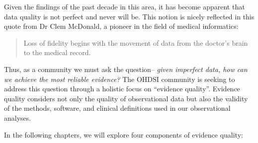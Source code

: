 \documentclass[11pt]{book}
\theoremstyle{definition}
\theoremstyle{definition}
\theoremstyle{definition}
\theoremstyle{remark}
\begin{document}
Given the findings of the past decade in this area, it has become apparent that data quality is not perfect and never will be. This notion is nicely reflected in this quote from Dr Clem McDonald, a pioneer in the field of medical informatics:

\begin{quote}
Loss of fidelity begins with the movement of data from the doctor's brain to the medical record.
\end{quote}

Thus, as a community we must ask the question-- \emph{given imperfect data, how can we achieve the most reliable evidence?} The OHDSI community is seeking to address this question through a holistic focus on ``evidence quality''. Evidence quality considers not only the quality of observational data but also the validity of the methods, software, and clinical definitions used in our observational analyses.

In the following chapters, we will explore four components of evidence quality:
\end{document}
